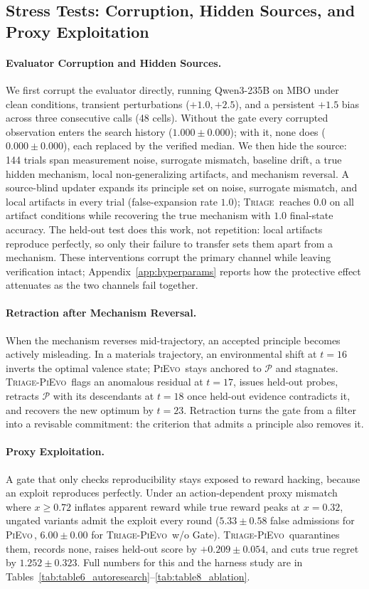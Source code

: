 \documentclass{article}
\newcommand{\triage}{\textsc{Triage}\,}
\newcommand{\method}{\textsc{Triage-PiEvo}\,}
\newcommand{\pievo}{\textsc{PiEvo}\,}
\begin{document}
\subsection{Stress Tests: Corruption, Hidden Sources, and Proxy Exploitation}
\label{sec:case}

\paragraph{Evaluator Corruption and Hidden Sources.}
We first corrupt the evaluator directly, running Qwen3-235B on MBO under clean conditions, transient perturbations ($+1.0,+2.5$), and a persistent $+1.5$ bias across three consecutive calls (48 cells). Without the gate every corrupted observation enters the search history ($1.000\pm0.000$); with it, none does ($0.000\pm0.000$), each replaced by the verified median. We then hide the source: 144 trials span measurement noise, surrogate mismatch, baseline drift, a true hidden mechanism, local non-generalizing artifacts, and mechanism reversal. A source-blind updater expands its principle set on noise, surrogate mismatch, and local artifacts in every trial (false-expansion rate $1.0$); \triage{} reaches $0.0$ on all artifact conditions while recovering the true mechanism with $1.0$ final-state accuracy. The held-out test does this work, not repetition: local artifacts reproduce perfectly, so only their failure to transfer sets them apart from a mechanism. These interventions corrupt the primary channel while leaving verification intact; Appendix~\ref{app:hyperparams} reports how the protective effect attenuates as the two channels fail together.

\paragraph{Retraction after Mechanism Reversal.}
When the mechanism reverses mid-trajectory, an accepted principle becomes actively misleading. In a materials trajectory, an environmental shift at $t=16$ inverts the optimal valence state; \pievo{} stays anchored to $\mathcal{P}$ and stagnates. \method{} flags an anomalous residual at $t=17$, issues held-out probes, retracts $\mathcal{P}$ with its descendants at $t=18$ once held-out evidence contradicts it, and recovers the new optimum by $t=23$. Retraction turns the gate from a filter into a revisable commitment: the criterion that admits a principle also removes it.

\paragraph{Proxy Exploitation.}
A gate that only checks reproducibility stays exposed to reward hacking, because an exploit reproduces perfectly. Under an action-dependent proxy mismatch where $x\geq0.72$ inflates apparent reward while true reward peaks at $x=0.32$, ungated variants admit the exploit every round ($5.33\pm0.58$ false admissions for \pievo{}, $6.00\pm0.00$ for \method{} w/o Gate). \method{} quarantines them, records none, raises held-out score by $+0.209\pm0.054$, and cuts true regret by $1.252\pm0.323$. Full numbers for this and the harness study are in Tables~\ref{tab:table6_autoresearch}--\ref{tab:table8_ablation}.
\end{document}
